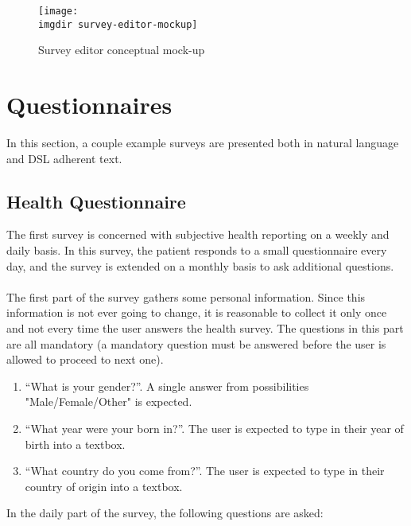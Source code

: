 \begin{figure}[!ht]
  \centering
  \texttt{[image: \\imgdir survey-editor-mockup]}
  \caption{Survey editor conceptual mock-up}
  \label{fig:survey-editor-mockup}
\end{figure}

\section{Questionnaires}
\label{sec:questionnaires}
In this section, a couple example surveys are presented both in natural language and DSL adherent text.

\subsection{Health Questionnaire}
\label{subsec:healthquestionnaire}
The first survey is concerned with subjective health reporting on a weekly and daily basis. In this survey, the patient responds to a small questionnaire every day, and the survey is extended on a monthly basis to ask additional questions.\\\\
The first part of the survey gathers some personal information. Since this information is not ever going to change, it is reasonable to collect it only once and not every time the user answers the health survey. The questions in this part are all mandatory (a mandatory question must be answered before the user is allowed to proceed to next one).

\begin{enumerate}
\item ``What is your gender?''. A single answer from possibilities "Male/Female/Other" is expected.
\item ``What year were your born in?''. The user is expected to type in their year of birth into a textbox.
\item ``What country do you come from?''. The user is expected to type in their country of origin into a textbox.
\end{enumerate}

In the daily part of the survey, the following questions are asked: 

